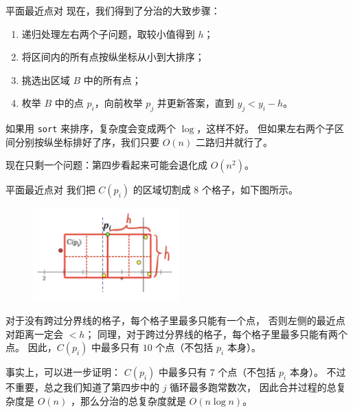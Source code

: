 \documentclass{beamer}
\begin{document}
\begin{frame}[fragile]{平面最近点对}
    \footnotesize
    现在，我们得到了分治的大致步骤：
    \begin{enumerate}
        \item 递归处理左右两个子问题，取较小值得到 $h$；
        \item 将区间内的所有点按纵坐标从小到大排序；
        \item 挑选出区域 $B$ 中的所有点；
        \item 枚举 $B$ 中的点 $p_i$，向前枚举 $p_j$ 并更新答案，直到 $y_j<y_i-h$。
    \end{enumerate}

    \vspace{1em}\pause
    如果用 \verb|sort| 来排序，复杂度会变成两个 $\log$，这样不好。
    但如果左右两个子区间分别按纵坐标排好了序，我们只要 $O(n)$ 二路归并就行了。

    \vspace{1em}
    现在只剩一个问题：第四步看起来可能会退化成 $O(n^2)$。
\end{frame}

\begin{frame}[fragile]{平面最近点对}
    \footnotesize
    我们把 $C(p_i)$ 的区域切割成 $8$ 个格子，如下图所示。

    \begin{figure}[H]
        \centering
        \includegraphics[width=0.5\textwidth]{pic/nearest-points3.jpg}
    \end{figure}

    \pause
    对于没有跨过分界线的格子，每个格子里最多只能有一个点，
    否则左侧的最近点对距离一定会 $<h$；
    同理，对于跨过分界线的格子，每个格子里最多只能有两个点。
    因此，$C(p_i)$ 中最多只有 $10$ 个点（不包括 $p_i$ 本身）。

    \vspace{1em}
    事实上，可以进一步证明： $C(p_i)$ 中最多只有 $7$ 个点（不包括 $p_i$ 本身）。
    不过不重要，总之我们知道了第四步中的 $j$ 循环最多跑常数次，
    因此合并过程的总复杂度是 $O(n)$ ，那么分治的总复杂度就是 $O(n\log n)$。
\end{frame}
\end{document}
